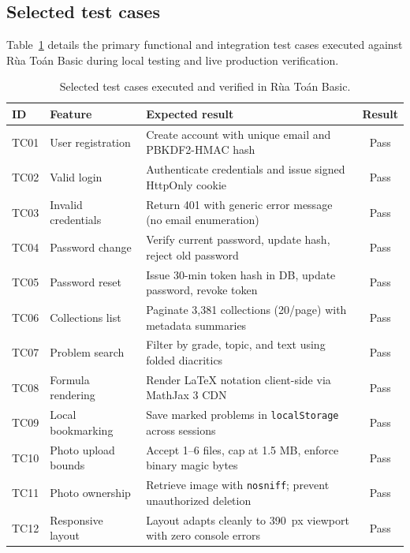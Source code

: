 \subsection{Selected test cases}
Table~\ref{tab:test-cases} details the primary functional and integration test cases executed
against Rùa Toán Basic during local testing and live production verification.

\begin{table}[ht]
\centering\small
\begin{tabularx}{\textwidth}{@{}l l >{\raggedright\arraybackslash}X c@{}}
\toprule
\textbf{ID} & \textbf{Feature} & \textbf{Expected result} & \textbf{Result}\\
\midrule
TC01 & User registration & Create account with unique email and PBKDF2-HMAC hash & Pass\\
TC02 & Valid login & Authenticate credentials and issue signed HttpOnly cookie & Pass\\
TC03 & Invalid credentials & Return 401 with generic error message (no email enumeration) & Pass\\
TC04 & Password change & Verify current password, update hash, reject old password & Pass\\
TC05 & Password reset & Issue 30-min token hash in DB, update password, revoke token & Pass\\
TC06 & Collections list & Paginate 3,381 collections (20/page) with metadata summaries & Pass\\
TC07 & Problem search & Filter by grade, topic, and text using folded diacritics & Pass\\
TC08 & Formula rendering & Render LaTeX notation client-side via MathJax 3 CDN & Pass\\
TC09 & Local bookmarking & Save marked problems in \texttt{localStorage} across sessions & Pass\\
TC10 & Photo upload bounds & Accept 1--6 files, cap at 1.5 MB, enforce binary magic bytes & Pass\\
TC11 & Photo ownership & Retrieve image with \texttt{nosniff}; prevent unauthorized deletion & Pass\\
TC12 & Responsive layout & Layout adapts cleanly to 390~px viewport with zero console errors & Pass\\
\bottomrule
\end{tabularx}
\caption{Selected test cases executed and verified in Rùa Toán Basic.}
\label{tab:test-cases}
\end{table}

